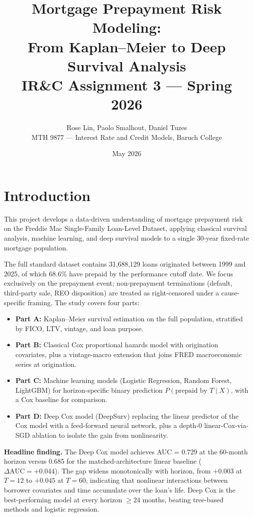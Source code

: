 \documentclass[11pt,a4paper]{article}
\title{\vspace{-1.5em}\textbf{Mortgage Prepayment Risk Modeling:\\
From Kaplan--Meier to Deep Survival Analysis}\\[0.3em]
\large IR\&C Assignment 3 --- Spring 2026}
\author{Rose Lin, Paolo Smalhout, Daniel Tuzes\\\small MTH 9877 --- Interest Rate and Credit Models, Baruch College}
\date{May 2026}
\begin{document}
\maketitle
\vspace{-1.2em}

\section{Introduction}

This project develops a data-driven understanding of mortgage prepayment risk on the Freddie Mac Single-Family Loan-Level Dataset, applying classical survival analysis, machine learning, and deep survival models to a single 30-year fixed-rate mortgage population.

The full standard dataset contains 31{,}688{,}129 loans originated between 1999 and 2025, of which 68.6\% have prepaid by the performance cutoff date. We focus exclusively on the prepayment event; non-prepayment terminations (default, third-party sale, REO disposition) are treated as right-censored under a cause-specific framing. The study covers four parts:

\begin{itemize}[leftmargin=1.2em,itemsep=2pt,topsep=2pt]
  \item \textbf{Part A:} Kaplan--Meier survival estimation on the full population, stratified by FICO, LTV, vintage, and loan purpose.
  \item \textbf{Part B:} Classical Cox proportional hazards model with origination covariates, plus a vintage-macro extension that joins FRED macroeconomic series at origination.
  \item \textbf{Part C:} Machine learning models (Logistic Regression, Random Forest, LightGBM) for horizon-specific binary prediction $P(\text{prepaid by } T \mid X)$, with a Cox baseline for comparison.
  \item \textbf{Part D:} Deep Cox model (DeepSurv) replacing the linear predictor of the Cox model with a feed-forward neural network, plus a depth-0 linear-Cox-via-SGD ablation to isolate the gain from nonlinearity.
\end{itemize}

\textbf{Headline finding.} The Deep Cox model achieves AUC = 0.729 at the 60-month horizon versus 0.685 for the matched-architecture linear baseline ($\Delta\text{AUC} = +0.044$). The gap widens monotonically with horizon, from $+0.003$ at $T{=}12$ to $+0.045$ at $T{=}60$, indicating that nonlinear interactions between borrower covariates and time accumulate over the loan's life. Deep Cox is the best-performing model at every horizon $\geq 24$ months, beating tree-based methods and logistic regression.
\end{document}
